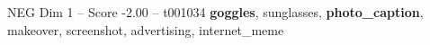 \begin{textsample}{NEG Dim 1 – Score -2.00 – t001034}  \label{ex:f1_neg_025}
\textbf{goggles}, sunglasses, \textbf{photo\_caption}, makeover, screenshot, advertising, internet\_meme

\end{textsample}
